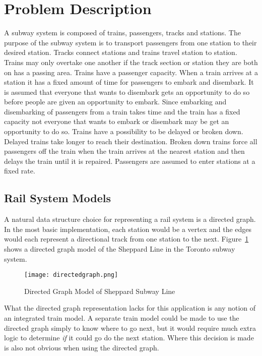 \section{Problem Description}

A subway system is composed of trains, passengers, tracks and stations. The
purpose of the subway system is to transport passengers from one station to
their desired station. Tracks connect stations and trains travel station to
station. Trains may only overtake one another if the track section or station
they are both on has a passing area. Trains have a passenger capacity. When a
train arrives at a station it has a fixed amount of time for passengers to
embark and disembark. It is assumed that everyone that wants to disembark gets
an opportunity to do so before people are given an opportunity to embark. Since
embarking and disembarking of passengers from a train takes time and the train
has a fixed capacity not everyone that wants to embark or disembark may be get
an opportunity to do so. Trains have a possibility to be delayed or broken down.
Delayed trains take longer to reach their destination. Broken down trains force
all passengers off the train when the train arrives at the nearest station and
then delays the train until it is repaired. Passengers are assumed to enter
stations at a fixed rate.

\subsection{Rail System Models}

A natural data structure choice for representing a rail system is a directed
graph.  In the most basic implementation, each station would be a vertex and the
edges would each represent a directional track from one station to the next.
Figure~\ref{fig:directedgraph} shows a directed graph model of the Sheppard Line
in the Toronto subway system.

\begin{figure}[htb]
	\centering
	\texttt{[image: directedgraph.png]}
	\caption{Directed Graph Model of Sheppard Subway Line}
	\label{fig:directedgraph}
\end{figure}

What the directed graph representation lacks for this application is any notion
of an integrated train model. A separate train model could be made to use the
directed graph simply to know where to go next, but it would require much extra
logic to determine \textit{if} it could go do the next station.  Where this
decision is made is also not obvious when using the directed graph.

